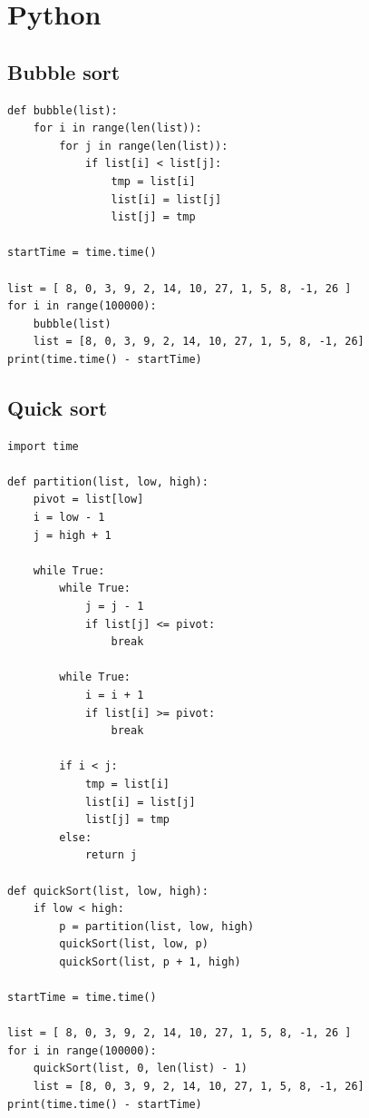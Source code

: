 \documentclass[a4paper, 12p]{book}
\begin{document}
\section{Python}

\subsection{Bubble sort}

\begin{lstlisting}
def bubble(list):
    for i in range(len(list)):
        for j in range(len(list)):
            if list[i] < list[j]:
                tmp = list[i]
                list[i] = list[j]
                list[j] = tmp

startTime = time.time()

list = [ 8, 0, 3, 9, 2, 14, 10, 27, 1, 5, 8, -1, 26 ]
for i in range(100000):
    bubble(list)
    list = [8, 0, 3, 9, 2, 14, 10, 27, 1, 5, 8, -1, 26]
print(time.time() - startTime)
\end{lstlisting}


\subsection{Quick sort}

\begin{lstlisting}
import time

def partition(list, low, high):
    pivot = list[low]
    i = low - 1
    j = high + 1

    while True:
        while True:
            j = j - 1
            if list[j] <= pivot:
                break

        while True:
            i = i + 1
            if list[i] >= pivot:
                break

        if i < j:
            tmp = list[i]
            list[i] = list[j]
            list[j] = tmp
        else:
            return j

def quickSort(list, low, high):
    if low < high:
        p = partition(list, low, high)
        quickSort(list, low, p)
        quickSort(list, p + 1, high)

startTime = time.time()

list = [ 8, 0, 3, 9, 2, 14, 10, 27, 1, 5, 8, -1, 26 ]
for i in range(100000):
    quickSort(list, 0, len(list) - 1)
    list = [8, 0, 3, 9, 2, 14, 10, 27, 1, 5, 8, -1, 26]
print(time.time() - startTime)
\end{lstlisting}
\end{document}
